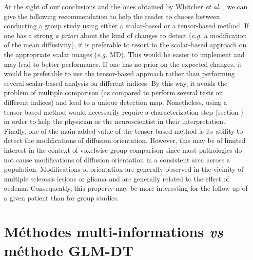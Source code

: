 At the sight of our conclusions and the ones obtained by Whitcher \textit{et al.} \cite{Whitcher2007}, 
we can give the following recommendation to help the reader to choose between conducting a group study 
using either a scalar-based or a tensor-based method. 
If one has a strong \textit{a priori} about the kind of changes to detect (\textit{e.g.} a modification of the mean diffusivity), 
it is preferable to resort to the scalar-based approach on the appropriate scalar images (\textit{e.g.}  MD). This would be easier to implement and may lead to better performance.
If one has no prior on the expected changes, it would be preferable to use the tensor-based approach rather than performing several scalar-based analysis on different indices. 
By this way, it avoids the problem of multiple comparison (as compared to perform several tests on different indices) and lead to a unique detection map.
Nonetheless, using a tensor-based method would necessarily require a characterization step (section )
in order to help the physician or the neuroscientist in their interpretation.
Finally, one of the main added value of the tensor-based method is its ability to detect the modifications of diffusion orientation. 
However, this may be of limited interest in the context of voxelwise group comparison since most pathologies do not cause modifications of diffusion orientation in a consistent area across
a population. Modifications of orientation are generally observed in the vicinity of multiple sclerosis lesions or 
glioma and are generally related to the effect of oedema.
Consequently, this property may be more interesting for the follow-up of a given patient \cite{Grigis2012} than for group studies.


\section{Méthodes multi-informations \textit{vs} méthode GLM-DT}

